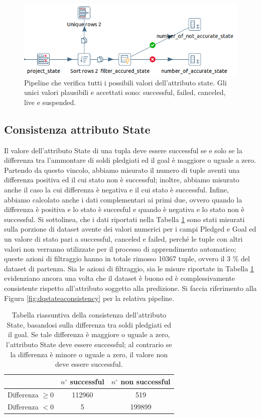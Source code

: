 \begin{figure}
	\centering
	\includegraphics[width=0.7\linewidth]{images/DQ_stateaccuracy}
	\caption{Pipeline che verifica tutti i possibili valori dell'attributo state. Gli unici valori plausibili e accettati sono: successful, failed, canceled, live e suspended.}
	\label{fig:dqstateaccuracy}
\end{figure}

\subsection{Consistenza attributo State}
Il valore dell'attributo State di una tupla deve essere successful se e solo se la differenza tra l'ammontare di soldi pledgiati ed il goal è maggiore o uguale a zero.
Partendo da questo vincolo, abbiamo misurato il numero di tuple aventi una differenza positiva ed il cui stato non è successful; inoltre, abbiamo misurato anche il caso la cui differenza è negativa e il cui stato è successful.
Infine, abbiamo calcolato anche i dati complementari ai primi due, ovvero quando la differenza è positiva e lo stato è succesful e quando è negativa e lo stato non è successful.
Si sottolinea, che i dati riportati nella Tabella \ref{tab:cons_state} sono stati misurati sulla porzione di dataset avente dei valori numerici per i campi Pledged e Goal ed un valore di stato pari a successful, canceled e failed, perché le tuple con altri valori non verranno utilizzate per il processo di apprendimento automatico; queste azioni di filtraggio hanno in totale rimosso 10367 tuple, ovvero il 3 \% del dataset di partenza. 
Sia le azioni di filtraggio, sia le misure riportate in Tabella \ref{tab:cons_state} evidenziano ancora una volta che il dataset è buono ed è complessivamente consistente rispetto all'attributo soggetto alla predizione.
Si faccia riferimento alla Figura \ref{fig:dqstateaconsistency} per la relativa pipeline.
\begin{table}
	\caption{Tabella riassuntiva della consistenza dell'attributo State, basandosi sulla differenza tra soldi pledgiati ed il goal. Se tale differenza è maggiore o uguale a zero, l'attributo State deve essere successful; al contrario se la differenza è minore o uguale a zero, il valore non deve essere successful.}
	
	\label{tab:cons_state}
	
	\centering
	\begin{tabular}{c|cc}
		& $n^{\circ}$ successful & $n^{\circ}$ non successful \\
		\hline
		\rule{0pt}{13pt}Differenza $\geq 0$  & 112960 & 519 \\ 
		\rule{0pt}{13pt}Differenza $< 0$& 5 & 199899 \\
	\end{tabular}
\end{table} 
